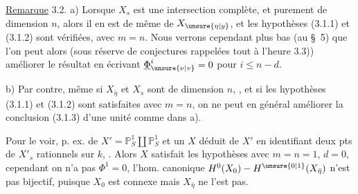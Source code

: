 \uline{Remarque} 3.2. a) Lorsque $X_s$ est  une intersection complète,  et purement de dimension $n$, alors   il en est de même de $X_{\unsure{\eta|y}}$, et les hypothèses (3.1.1) et (3.1.2) sont vérifiées, avec $m=n$. Nous verrons cependant plus bas (au \deleted{\unsure{\S}}\S\ 5) que l'on peut alors (sous réserve de conjectures rappelées  tout à l'heure 3.3)) améliorer le résultat  en écrivant $\underline\Phi^i_{\unsure{\nu|v}}=0$ pour $i\leq n-d$.

b) Par contre,  même si $X_{\bar\eta}$ et $X_s$ sont   de dimension $n$, , et si les hypothèses (3.1.1) et (3.1.2) sont satisfaites  avec $m=n$, on ne peut en général améliorer la conclusion (3.1.3) d'une unité comme dans a).

 Pour le voir,  p. ex. de   $X'=\mathbb P^1_S\amalg\mathbb P^1_S$ et  un $X$ déduit de $X'$ en identifiant deux pts  de $X'_s$ rationnels sur $k$, . Alors  $X$ satisfait les hypothèses avec $m=n=1$, $d=0$, cependant  on n'a pas $\Phi^1=0$,   l'hom. canonique $H^0(X_0)\mathbin{-}H^{\unsure{0|1}}(X_{\bar\eta})$ n'est pas bijectif, puisque $X_0$ est connexe mais $X_{\bar\eta}$ ne l'est pas.
